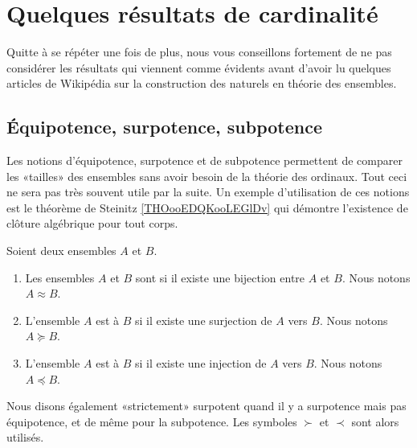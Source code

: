 \section{Quelques résultats de cardinalité}

Quitte à se répéter une fois de plus, nous vous conseillons fortement de ne pas considérer les résultats qui viennent comme évidents avant d'avoir lu quelques articles de Wikipédia sur la construction des naturels en théorie des ensembles.

\subsection{Équipotence, surpotence, subpotence}

Les notions d'équipotence, surpotence et de subpotence permettent de comparer les «tailles» des ensembles sans avoir besoin de la théorie des ordinaux. Tout ceci ne sera pas très souvent utile par la suite. Un exemple d'utilisation de ces notions est le théorème de Steinitz \ref{THOooEDQKooLEGlDv} qui démontre l'existence de clôture algébrique pour tout corps.

\begin{definition}      \label{DEFooXGXZooIgcBCg}
    Soient deux ensembles \( A\) et \( B\).
    \begin{enumerate}
        \item
            Les ensembles \( A\) et \( B\) sont  si il existe une bijection entre \( A\) et \( B\). Nous notons \( A\approx B\).
        \item
            L'ensemble \( A\) est  à \( B\) si il existe une surjection de \( A\) vers \( B\). Nous notons \( A\succeq B\).
        \item
            L'ensemble \( A\) est  à \( B\) si il existe une injection de \( A\) vers \( B\). Nous notons \( A\preceq B\).
    \end{enumerate}
    Nous disons également «strictement» surpotent quand il y a surpotence mais pas équipotence, et de même pour la subpotence. Les symboles \( \succ\) et \( \prec\) sont alors utilisés.
\end{definition}

